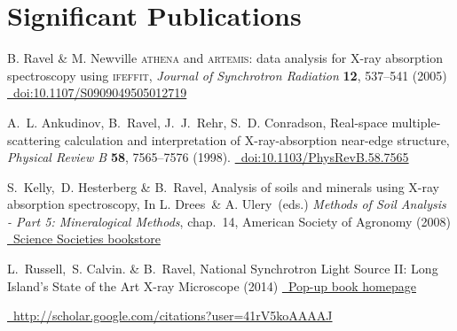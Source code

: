 \documentclass[11pt]{moderncv}
\begin{document}
\section{Significant Publications}
\label{sec:highlights}

%
{\small B. Ravel \& M. Newville \textsc{athena} and
  \textsc{artemis}: data analysis for X-ray absorption spectroscopy
  using \textsc{ifeffit}, \emph{Journal of Synchrotron Radiation}
  \textbf{12}, 537--541 (2005)
  \href{https://doi.org/10.1107/S0909049505012719}
  {\color{color2}\homepagesymbol~doi:10.1107/S0909049505012719}}

%
{\small A.~L. Ankudinov,  B.~Ravel,  J.~J.~Rehr,  S.~D. Conradson,
  Real-space multiple-scattering calculation and interpretation of
  X-ray-absorption near-edge structure, \emph{Physical Review B}
  \textbf{58}, 7565--7576 (1998).
  \href{https://doi.org/10.1103/PhysRevB.58.7565}
  {\color{color2}\homepagesymbol~doi:10.1103/PhysRevB.58.7565}}

%
{\small S.\ Kelly,\ D. Hesterberg \& B.\ Ravel, Analysis of soils and
  minerals using X-ray absorption spectroscopy, In L. Drees\ \&
  A. Ulery\ (eds.)  \emph{Methods of Soil Analysis - Part 5:
    Mineralogical Methods}, chap.~14, American Society of Agronomy
  (2008)
  \href{https://portal.sciencesocieties.org/Purchase/ProductDetail.aspx?Product_code=802f0511-76f0-dc11-b6b8-0013210e308c}
  {\color{color2}\homepagesymbol~Science Societies bookstore}}

%
{\small L.\ Russell,\ S. Calvin. \& B.\ Ravel, National Synchrotron
  Light Source II: Long Island's State of the Art X-ray Microscope
  (2014)
  \href{http://bruceravel.github.io/synchrotron_pop_up_book/}
  {\color{color2}\homepagesymbol~Pop-up book homepage}}

%
{\small \href{http://scholar.google.com/citations?user=41rV5koAAAAJ}
{\color{color2}\homepagesymbol~http://scholar.google.com/citations?user=41rV5koAAAAJ}}

\nocite{*}


\end{document}
